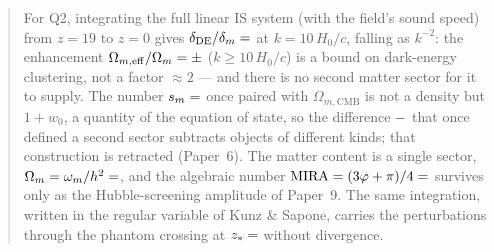 \documentclass[12pt,a4paper]{article}
\begin{document}
\begin{abstract}
For Q2, integrating the full linear IS system (with the field's sound speed) from
$z=19$ to $z=0$ gives $\delta_{\mathrm{DE}}/\delta_m = \val{q2_r_k3}$ at
$k=10\,H_0/c$, falling as $k^{-2}$: the enhancement
$\Omega_{m,\mathrm{eff}}/\Omega_m = \val{R_media_k10_p5}\pm \val{R_sd_k10_p5}$ ($k\geq10\,H_0/c$)
is a bound on dark-energy clustering, not a factor $\approx2$ --- and there is no
second matter sector for it to supply. The number $s_m=\val{S_M_d6}$
once paired with $\Omega_{m,\mathrm{CMB}}$ is not a density but $1+w_0$, a quantity of the
equation of state, so the difference $\val{OMEGA_M_TOTAL_d6}-\val{S_M_d6}$ that once defined a
second sector subtracts objects of different kinds; that construction is retracted
(Paper~6). The matter content is a single sector, $\Omega_m = \omega_m/h^2 =
\val{OMEGA_M_TOTAL_d6}$, and the algebraic number $\mathrm{MIRA}=(3\varphi+\pi)/4=\val{MIRA_d6}$
survives only as the Hubble-screening amplitude of Paper~9. The same integration,
written in the regular variable of Kunz \& Sapone, carries the perturbations through
the phantom crossing at $z_*=\val{z_cruce}$ without divergence.


\end{abstract}
\end{document}
